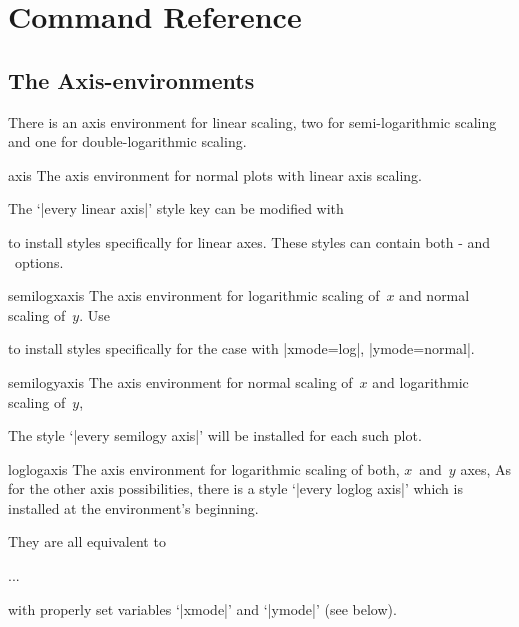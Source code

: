 
\section{Command Reference}
\subsection{The Axis-environments}
There is an axis environment for linear scaling, two for semi-logarithmic scaling and one for double-logarithmic scaling.
\begin{environment}{{axis}}
	The axis environment for normal plots with linear axis scaling.

	The `|every linear axis|' style key can be modified with
\begin{codeexample}
\end{codeexample}
to install styles specifically for linear axes. These styles can contain both \Tikz- and \PGFPlots\ options.
\end{environment}

\begin{environment}{{semilogxaxis}}
The axis environment for logarithmic scaling of~$x$ and normal scaling of~$y$.
Use
\begin{codeexample}
\end{codeexample}
to install styles specifically for the case with |xmode=log|, |ymode=normal|.
\end{environment}

\begin{environment}{{semilogyaxis}}
The axis environment for normal scaling of~$x$ and logarithmic scaling of~$y$,

The style `|every semilogy axis|' will be installed for each such plot.
\end{environment}

\begin{environment}{{loglogaxis}}
The axis environment for logarithmic scaling of both, $x$~and~$y$ axes,
As for the other axis possibilities, there is a style `|every loglog axis|' which is installed at the environment's beginning.
\end{environment}

\noindent
They are all equivalent to
\begin{codeexample}
\begin{axis}[
	xmode=log|normal,
	ymode=log|normal]
...
\end{axis}
\end{codeexample}
\noindent
with properly set variables `|xmode|' and `|ymode|' (see below).

